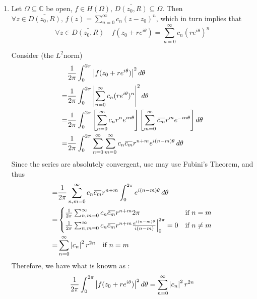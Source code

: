 \documentclass[notoc,notitlepage]{tufte-book}
\begin{document}
\begin{ex}
\begin{enumerate}
		\item {} Let $\Omega \subseteq \mathbb{C}$ be open, $f \in H(\Omega), \, \bar{D(z_0, R)} \subseteq \Omega$. Then $\forall z \in \bar{D(z_0, R)}, \, f(z) = \sum_{n=0}^{\infty} c_n (z - z_0)^n$, which in turn implies that \label{item:parseval_s_theorem}
		\begin{equation*}\tag{$\dagger$}\label{eq:parseval_s_l2_norm}
			\forall z \in \bar{D(z_0, R)} \quad f(z_0 + re^{i \theta}) = \sum_{n=0}^{\infty} c_n (re^{i \theta})^n
		\end{equation*}

			Consider (the $L^2$norm)
			\begin{align*}
				& \frac{1}{2 \pi} \int_{0}^{2 \pi} \abs{f(z_0 + re^{i \theta})}^2 \dif{\theta} \\
				=&\frac{1}{2 \pi} \int_{0}^{2 \pi} \abs{\sum_{n=0}^{\infty} c_n (re^{i \theta})^n}^2 \dif{\theta} \\
				=& \frac{1}{2 \pi} \int_{0}^{2 \pi} \left[ \sum_{n=0}^{\infty} c_n r^n e^{i n \theta} \right] \left[\sum_{m=0}^{\infty} \bar{c_m} r^m e^{-i n \theta} \right] \dif{\theta} \\
				=& \frac{1}{2 \pi} \int_{0}^{2 \pi} \sum_{n=0}^{\infty} \sum_{m=0}^{\infty} c_n \bar{c_m} r^{n + m} e^{i (n - m) \theta} \dif{\theta} 
			\end{align*}
			Since the series are absolutely convergent, use may use Fubini's Theorem, and thus
			\begin{align*}
				=& \frac{1}{2 \pi} \sum_{n,m = 0}^{\infty} c_n \bar{c_m} r^{n + m} \int_{0}^{2 \pi} e^{i (n - m) \theta} \dif{\theta} \\
				=& \begin{cases}
					\frac{1}{2 \pi} \sum_{n,m = 0}^{\infty} c_n \bar{c_m} r^{n + m} 2 \pi & \text{if } n = m \\
					\frac{1}{2 \pi} \sum_{n,m = 0}^{\infty} c_n \bar{c_m} r^{n + m} \frac{e^{i (n - m) \theta}}{i (n - m)} \at{0}{2 \pi} = 0 & \text{if } n \neq m
				\end{cases} \\
				=& \sum_{n=0}^{\infty} \abs{c_n}^2 r^{2n} \quad \text{if } n = m
			\end{align*}
			Therefore, we have what is known as :
			\begin{equation}\label{eq:parseval_s_identity}
				\frac{1}{2 \pi} \int_{0}^{2 \pi} \left|f(z_0 + re^{i \theta})\right|^2 \mathop{}\!d{\theta} = \sum_{n=0}^{\infty} \left|c_n\right|^2 r^{2n}
			\end{equation}


\end{enumerate}
\end{ex}
\end{document}
